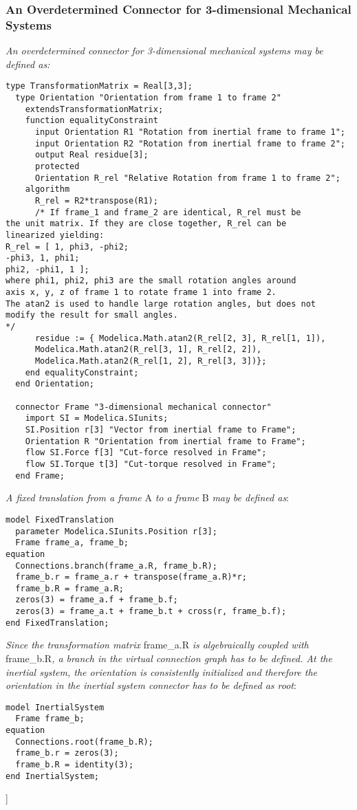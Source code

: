 \subsubsection{An Overdetermined Connector for 3-dimensional Mechanical Systems}

\emph{An overdetermined connector for 3-dimensional mechanical systems
may be defined as:}

\begin{lstlisting}[language=modelica]
  type TransformationMatrix = Real[3,3];
  type Orientation "Orientation from frame 1 to frame 2"
    extendsTransformationMatrix;
    function equalityConstraint
      input Orientation R1 "Rotation from inertial frame to frame 1";
      input Orientation R2 "Rotation from inertial frame to frame 2";
      output Real residue[3];
      protected
      Orientation R_rel "Relative Rotation from frame 1 to frame 2";
    algorithm
      R_rel = R2*transpose(R1);
      /* If frame_1 and frame_2 are identical, R_rel must be
the unit matrix. If they are close together, R_rel can be
linearized yielding:
R_rel = [ 1, phi3, -phi2;
-phi3, 1, phi1;
phi2, -phi1, 1 ];
where phi1, phi2, phi3 are the small rotation angles around
axis x, y, z of frame 1 to rotate frame 1 into frame 2.
The atan2 is used to handle large rotation angles, but does not
modify the result for small angles.
*/
      residue := { Modelica.Math.atan2(R_rel[2, 3], R_rel[1, 1]),
      Modelica.Math.atan2(R_rel[3, 1], R_rel[2, 2]),
      Modelica.Math.atan2(R_rel[1, 2], R_rel[3, 3])};
    end equalityConstraint;
  end Orientation;

  connector Frame "3-dimensional mechanical connector"
    import SI = Modelica.SIunits;
    SI.Position r[3] "Vector from inertial frame to Frame";
    Orientation R "Orientation from inertial frame to Frame";
    flow SI.Force f[3] "Cut-force resolved in Frame";
    flow SI.Torque t[3] "Cut-torque resolved in Frame";
  end Frame;
\end{lstlisting}
\emph{A fixed translation from a frame} A \emph{to a frame} B \emph{may
be defined as}:

\begin{lstlisting}[language=modelica]
model FixedTranslation
  parameter Modelica.SIunits.Position r[3];
  Frame frame_a, frame_b;
equation
  Connections.branch(frame_a.R, frame_b.R);
  frame_b.r = frame_a.r + transpose(frame_a.R)*r;
  frame_b.R = frame_a.R;
  zeros(3) = frame_a.f + frame_b.f;
  zeros(3) = frame_a.t + frame_b.t + cross(r, frame_b.f);
end FixedTranslation;
\end{lstlisting}
\emph{Since the transformation matrix} frame\_a.R \emph{is algebraically
coupled with} frame\_b.R\emph{, a branch in the virtual connection graph
has to be defined. At the inertial system, the orientation is
consistently initialized and therefore the orientation in the inertial
system connector has to be defined as root}:

\begin{lstlisting}[language=modelica]
model InertialSystem
  Frame frame_b;
equation
  Connections.root(frame_b.R);
  frame_b.r = zeros(3);
  frame_b.R = identity(3);
end InertialSystem;
\end{lstlisting}
{]}
